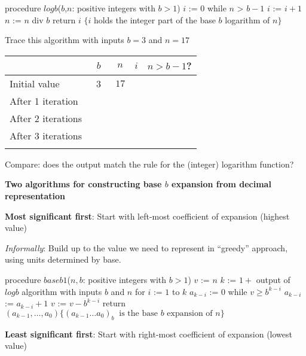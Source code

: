 \documentclass[12pt, oneside]{article}
\begin{document}
\begin{algorithm}[caption={Calculating integer part of base $b$ logarithm}]
   procedure $logb$($b$,$n$: positive integers with $b > 1$)
   $i$ := $0$
   while $n$ > $b-1$
     $i$ := $i + 1$
     $n$ := $n$ div $b$
   return $i$ $\{ i$ holds the integer part of the base $b$ logarithm of $n\}$
\end{algorithm} 
Trace this algorithm with inputs $b=3$ and $n=17$

\vfill
  \begin{tabular}{l|c|c|c|c}
  & $b$ & $n$ & $i$  & $n > b-1$?\\
  \hline 
  Initial value & ~$3$~ & $17$ & \phantom{$0$} & \phantom{~Yes~}\\
  After 1 iteration  & \phantom{$3$} & \phantom{$5$} & \phantom{$1$} & \phantom{T}\\
  After 2 iterations & \phantom{$3$} & \phantom{$1$} & \phantom{$2$} & \phantom{F}\\
  After 3 iterations &  &  & & \\
  &&&&\\
  \end{tabular}

\vfill

\vfill

Compare: does the output match the rule for the (integer) logarithm function?


\newpage 

{\bf Two algorithms for constructing base $b$ expansion from decimal representation}

{\bf Most significant first}: Start with left-most coefficient of expansion (highest value)

{\it Informally}: Build up to the value we need to represent in ``greedy'' approach, using 
units determined by base.

\vfill


\begin{algorithm}[caption={Calculating base $b$ expansion, from left}]
procedure $\textit{baseb1}$($n, b$: positive integers with $b > 1$)
$v$ := $n$
$k$ := $1 + $ output of $logb$ algorithm with inputs $b$ and $n$
for $i$ := $1$ to $k$
  $a_{k-i}$ := $0$
  while $v \geq b^{k-i}$
    $a_{k-i}$ := $a_{k-i} + 1$
    $v$ := $v -  b^{k-i}$
return $(a_{k-1}, \ldots, a_0) \{(a_{k-1} \ldots a_0)_b~\textrm{ is the base } b \textrm{ expansion of } n \}$
\end{algorithm}

\vfill
\vfill

\newpage
{\bf Least significant first}: Start with right-most coefficient of expansion (lowest value)
\end{document}
